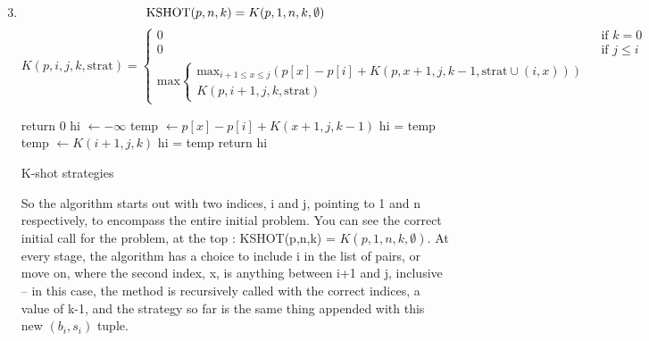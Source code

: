 
\usepackage{amsmath, verbatim, tikz, float, pgfplots, framed}
\usepackage[]{algorithm2e}

\usetikzlibrary{arrows,automata}

\oddsidemargin 0in
\evensidemargin 0in
\textwidth 6.5in
\topmargin -0.5in
\textheight 9.0in
\newcommand{\norm}[1]{\left\lVert #1 \right\rVert}


\pagestyle{myheadings}

\begin{enumerate}
  \setcounter{enumi}{2}
\item
  $$\text{KSHOT}(p, n, k) = K(p, 1, n, k, \emptyset)\\$$
  \begin{displaymath}
    K(p, i, j, k, \text{strat}) = \left\{
      \begin{array}{lr}
        0 & \text{ if } k = 0\\
        0 & \text{ if } j \leq i\\
        \text{max} \left\{ 
          \begin{array}{lr}
            \text{max}_{i+1 \leq x \leq j}(p[x] - p[i] + K(p, x+1, j, k-1, \text{strat} \cup (i,x)))\\
            K(p, i+1, j, k, \text{strat})
          \end{array}
        \right.
      \end{array}
    \right. 
  \end{displaymath}

  \begin{framed}
    \begin{algorithm}[H]
       {
        return 0\;
      }
      hi $\gets -\infty$\;
       {
        temp $\gets p[x] - p[i] + K(x+1, j, k-1)$\;
         {
          hi = temp\;
        }
      }
      temp $\gets K(i+1, j, k)$\;
       {
        hi = temp\;
      }
      return hi\;
      \caption{K-shot strategies}
    \end{algorithm}
  \end{framed}

  So the algorithm starts out with two indices, i and j, pointing to 1 and n respectively, to encompass the entire initial problem. You can see the correct initial call for the problem, at the top : KSHOT(p,n,k) = $K(p,1,n,k, \emptyset)$. At every stage, the algorithm has a choice to include i in the list of pairs, or move on, where the second index, x, is anything between i+1 and j, inclusive -- in this case, the method is recursively called with the correct indices, a value of k-1, and the strategy so far is the same thing appended with this new $(b_i,s_i)$ tuple.\\


\end{enumerate}
